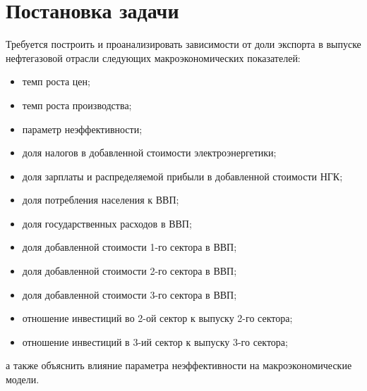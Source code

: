 \documentclass[10pt, a4paper]{article}
\begin{document}
\section{Постановка задачи}
Требуется построить и проанализировать зависимости от доли экспорта в выпуске нефтегазовой отрасли следующих макроэкономических показателей:
\begin{itemize}
\item темп роста цен;
\item темп роста производства;
\item параметр неэффективности;
\item доля налогов в добавленной стоимости электроэнергетики;
\item доля зарплаты и распределяемой прибыли в добавленной стоимости НГК;
\item доля потребления населения к ВВП;
\item доля государственных расходов в ВВП;
\item доля добавленной стоимости 1-го сектора в ВВП;
\item доля добавленной стоимости 2-го сектора в ВВП;
\item доля добавленной стоимости 3-го сектора в ВВП;
\item отношение инвестиций во 2-ой сектор к выпуску 2-го сектора;
\item отношение инвестиций в 3-ий сектор к выпуску 3-го сектора;
\end{itemize}
а также объяснить влияние параметра неэффективности на макроэкономические модели.
\end{document}
